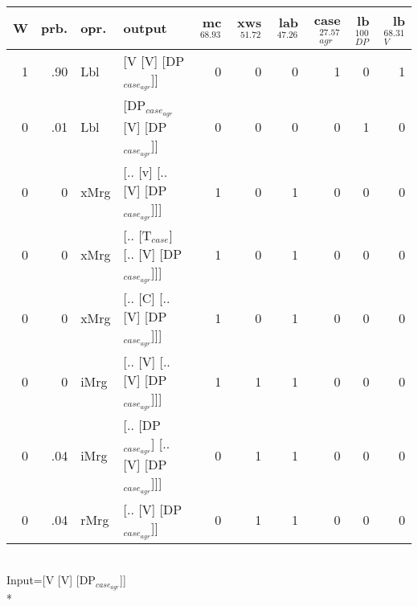 \begin{tabularx}{\linewidth}{rrlXrrrrrr}
\hline
   W &   prb. & opr.   & output                                    &   mc$^{68.93}$ &   xws$^{51.72}$ &   lab$^{47.26}$ &   case$_{agr}^{27.57}$ &   lb$_{DP}^{100}$ &   lb$_{V}^{68.31}$ \\
\hline
   1 &   .90 & Lbl  & [V [V] [DP$_{case_{agr}}$]]                     &            0 &             0 &             0 &                  1 &                0 &              1 \\
   0 &   .01 & Lbl  & [DP$_{case_{agr}}$ [V] [DP$_{case_{agr}}$]]           &            0 &             0 &             0 &                  0 &                1 &              0 \\
   0 &   0 & xMrg & [.. [v] [.. [V] [DP$_{case_{agr}}$]]]           &            1 &             0 &             1 &                  0 &                0 &              0 \\
   0 &   0 & xMrg & [.. [T$_{case}$] [.. [V] [DP$_{case_{agr}}$]]]      &            1 &             0 &             1 &                  0 &                0 &              0 \\
   0 &   0 & xMrg & [.. [C] [.. [V] [DP$_{case_{agr}}$]]]           &            1 &             0 &             1 &                  0 &                0 &              0 \\
   0 &   0 & iMrg & [.. [V] [.. [V] [DP$_{case_{agr}}$]]]           &            1 &             1 &             1 &                  0 &                0 &              0 \\
   0 &   .04 & iMrg & [.. [DP$_{case_{agr}}$] [.. [V] [DP$_{case_{agr}}$]]] &            0 &             1 &             1 &                  0 &                0 &              0 \\
   0 &   .04 & rMrg & [.. [V] [DP$_{case_{agr}}$]]                    &            0 &             1 &             1 &                  0 &                0 &              0 \\
\hline
\end{tabularx}\endgroup\\
\begingroup\scriptsize Input=[V [V] [DP$_{case_{agr}}$]]\\*
